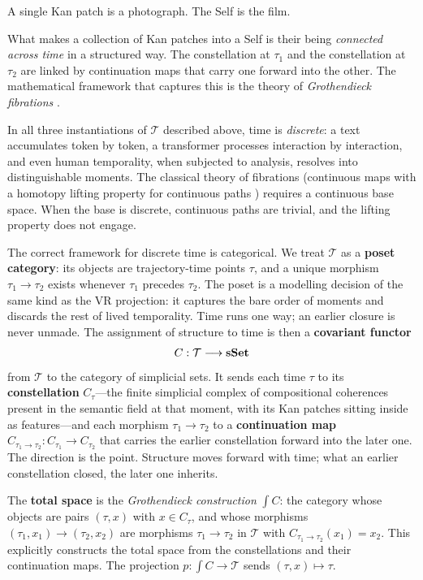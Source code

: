 A single Kan patch is a photograph. The Self is the film.

What makes a collection of Kan patches into a Self is their being \emph{connected across time} in a structured way. The constellation at $\tau_1$ and the constellation at $\tau_2$ are linked by continuation maps that carry one forward into the other. The mathematical framework that captures this is the theory of \emph{Grothendieck fibrations} \cite{grothendieck1971}.

In all three instantiations of $\mathcal{T}$ described above, time is \emph{discrete}: a text accumulates token by token, a transformer processes interaction by interaction, and even human temporality, when subjected to analysis, resolves into distinguishable moments. The classical theory of fibrations (continuous maps with a homotopy lifting property for continuous paths \cite{may1999concise}) requires a continuous base space. When the base is discrete, continuous paths are trivial, and the lifting property does not engage.

The correct framework for discrete time is categorical. We treat $\mathcal{T}$ as a \textbf{poset category}: its objects are trajectory-time points $\tau$, and a unique morphism $\tau_1 \to \tau_2$ exists whenever $\tau_1$ precedes $\tau_2$. The poset is a modelling decision of the same kind as the VR projection: it captures the bare order of moments and discards the rest of lived temporality. Time runs one way; an earlier closure is never unmade. The assignment of structure to time is then a \textbf{covariant functor}
\[
C : \mathcal{T} \longrightarrow \mathbf{sSet}
\]
from $\mathcal{T}$ to the category of simplicial sets. It sends each time $\tau$ to its \textbf{constellation} $C_\tau$---the finite simplicial complex of compositional coherences present in the semantic field at that moment, with its Kan patches sitting inside as features---and each morphism $\tau_1 \to \tau_2$ to a \textbf{continuation map} $C_{\tau_1 \to \tau_2} : C_{\tau_1} \to C_{\tau_2}$ that carries the earlier constellation forward into the later one. The direction is the point. Structure moves forward with time; what an earlier constellation closed, the later one inherits.

The \textbf{total space} is the \emph{Grothendieck construction} $\int C$: the category whose objects are pairs $(\tau, x)$ with $x \in C_\tau$, and whose morphisms $(\tau_1, x_1) \to (\tau_2, x_2)$ are morphisms $\tau_1 \to \tau_2$ in $\mathcal{T}$ with $C_{\tau_1 \to \tau_2}(x_1) = x_2$. This explicitly constructs the total space from the constellations and their continuation maps. The projection $p : \int C \to \mathcal{T}$ sends $(\tau, x) \mapsto \tau$.

